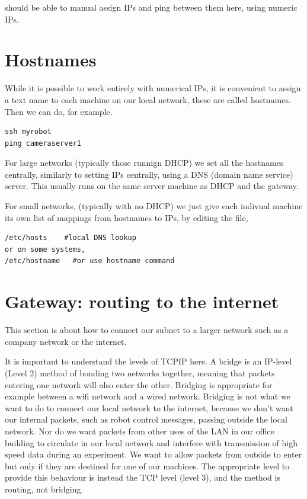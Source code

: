 \documentclass[oneside,english]{scrbook}
\begin{document}
should be able to manual assign IPs and ping between them here, using numeric IPs.

\section{Hostnames}

While it is possible to work entirely with numerical IPs, it is convenient to assign a text name to each machine on our local network, these are called hostnames.  Then we can do, for example.
\begin{lstlisting}
ssh myrobot
ping cameraserver1
\end{lstlisting}

For large networks (typically those runnign DHCP) we set all the hostnames centrally, similarly to setting IPs centrally, using a DNS (domain name service) server. This usually runs on the same server machine as DHCP and the gateway.

For small networks, (typically with no DHCP) we just give each indivual machine its own list of mappings from hostnames to IPs, by editing the file,
\begin{lstlisting}
/etc/hosts    #local DNS lookup 
or on some systems,
/etc/hostname   #or use hostname command 
\end{lstlisting}
  

\section{Gateway: routing to the internet}

This section is about how to connect our subnet to a larger network such as a company network or the internet. 

It is important to understand the levels of TCPIP here. A bridge is
an IP-level (Level 2) method of bonding two networks together, meaning that packets
entering one network will also enter the other. Bridging is appropriate
for example between a wifi network and a wired network. Bridging is
not what we want to do to connect our local network to the internet,
because we don't want our internal packets, such as robot control
messages, passing outside the local network. Nor do we want packets
from other uses of the LAN in our office building to circulate in
our local network and interfere with  transmission of high speed data
during an experiment. We want to allow packets from outside to enter
but only if they are destined for one of our machines. The appropriate
level to provide this behaviour is instead the TCP level (level 3), and the method
is routing, not bridging.
\end{document}
